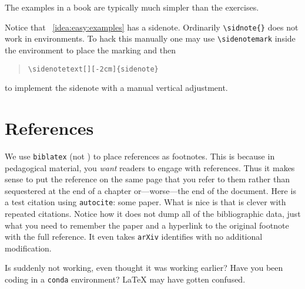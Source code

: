 \begin{bigidea}
\label{idea:easy:examples}
The examples in a book are typically much simpler than the exercises.\sidenotemark
\end{bigidea}

\noindent  Notice that \bigidearef{}~\ref{idea:easy:examples} has a sidenote. Ordinarily \verb!\sidnote{}! does not work in environments. To hack this manually one may use \verb!\sidenotemark! inside the environment to place the marking and then 
\begin{quotation}
\verb!\sidenotetext[][-2cm]{sidenote}!
\end{quotation}
to implement the sidenote with a manual vertical adjustment.



\section{References}

We use \texttt{biblatex} (not \BibTeX{}) to place references as footnotes. This is because in pedagogical material, you \emph{want} readers to engage with references. Thus it makes sense to put the reference on the same page that you refer to them rather than sequestered at the end of a chapter or---worse---the end of the document. Here is a test citation using \texttt{autocite}: some paper.\autocite{Feng:2016ijc} What is nice is that \BibLaTeX{} is clever with repeated citations.\autocite{Feng:2016ijc} Notice how it does not dump all of the bibliographic data, just what you need to remember the paper and a hyperlink to the original footnote with the full reference. It even takes \texttt{arXiv} identifies with no additional modification.


\begin{flipcomment}
Is \BibLaTeX{} suddenly not working, even thought it was working earlier? Have you been coding in a \texttt{conda} environment? \LaTeX{} may have gotten confused.
\end{flipcomment}